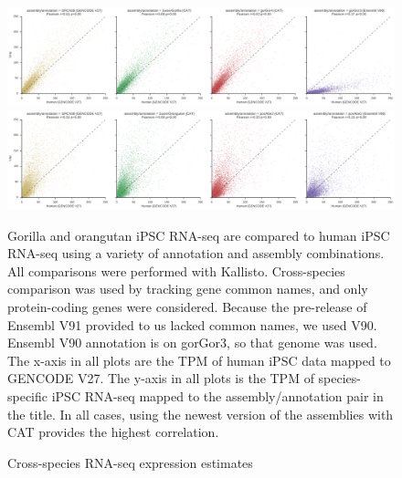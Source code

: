 \documentclass[fleqn,10pt]{wlscirep}
\begin{document}
\begin{figure}
\includegraphics[width=0.8\paperwidth,keepaspectratio]{gorilla_kallisto.pdf}

\includegraphics[width=0.8\paperwidth,keepaspectratio]{orangutan_kallisto.pdf}
\caption{Cross-species RNA-seq expression estimates}

Gorilla and orangutan iPSC RNA-seq are compared to human iPSC RNA-seq using a variety of annotation and assembly combinations. All comparisons were performed with Kallisto. Cross-species comparison was used by tracking gene common names, and only protein-coding genes were considered. Because the pre-release of Ensembl V91 provided to us lacked common names, we used V90. Ensembl V90 annotation is on gorGor3, so that genome was used. The x-axis in all plots are the TPM of human iPSC data mapped to GENCODE V27. The y-axis in all plots is the TPM of species-specific iPSC RNA-seq mapped to the assembly/annotation pair in the title. In all cases, using the newest version of the assemblies with CAT provides the highest correlation.
\label{supp_fig:primate_expression}
\end{figure}
\end{document}
